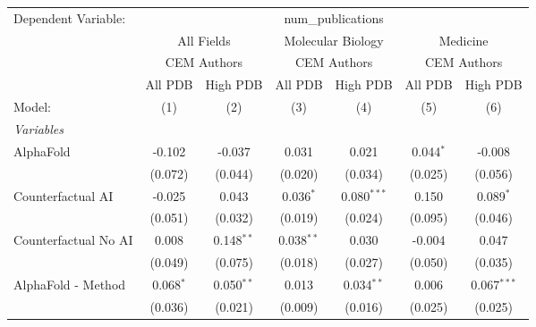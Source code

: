 \begingroup
\centering
\begin{tabular}{lcccccc}
   \tabularnewline \midrule \midrule
   Dependent Variable: & \multicolumn{6}{c}{num\_publications}\\
 & \multicolumn{2}{c}{All Fields} & \multicolumn{2}{c}{Molecular Biology} & \multicolumn{2}{c}{Medicine} \\
\cmidrule(lr){2-3} \cmidrule(lr){4-5} \cmidrule(lr){6-7}
 & \multicolumn{2}{c}{CEM Authors} & \multicolumn{2}{c}{CEM Authors} & \multicolumn{2}{c}{CEM Authors} \\
\cmidrule(lr){2-3} \cmidrule(lr){4-5} \cmidrule(lr){6-7}
 & \multicolumn{1}{c}{All PDB} & \multicolumn{1}{c}{High PDB} & \multicolumn{1}{c}{All PDB} & \multicolumn{1}{c}{High PDB} & \multicolumn{1}{c}{All PDB} & \multicolumn{1}{c}{High PDB} \\
\cmidrule(lr){2-2} \cmidrule(lr){3-3} \cmidrule(lr){4-4} \cmidrule(lr){5-5} \cmidrule(lr){6-6} \cmidrule(lr){7-7}
   Model:                                                     & (1)         & (2)          & (3)          & (4)           & (5)         & (6)\\  
   \midrule
   \emph{Variables}\\
   AlphaFold                                                  & -0.102      & -0.037       & 0.031        & 0.021         & 0.044$^{*}$ & -0.008\\   
                                                              & (0.072)     & (0.044)      & (0.020)      & (0.034)       & (0.025)     & (0.056)\\   
   Counterfactual AI                                          & -0.025      & 0.043        & 0.036$^{*}$  & 0.080$^{***}$ & 0.150       & 0.089$^{*}$\\   
                                                              & (0.051)     & (0.032)      & (0.019)      & (0.024)       & (0.095)     & (0.046)\\   
   Counterfactual No AI                                       & 0.008       & 0.148$^{**}$ & 0.038$^{**}$ & 0.030         & -0.004      & 0.047\\   
                                                              & (0.049)     & (0.075)      & (0.018)      & (0.027)       & (0.050)     & (0.035)\\   
   AlphaFold - Method                                         & 0.068$^{*}$ & 0.050$^{**}$ & 0.013        & 0.034$^{**}$  & 0.006       & 0.067$^{***}$\\   
                                                              & (0.036)     & (0.021)      & (0.009)      & (0.016)       & (0.025)     & (0.025)\\   

\end{tabular}
